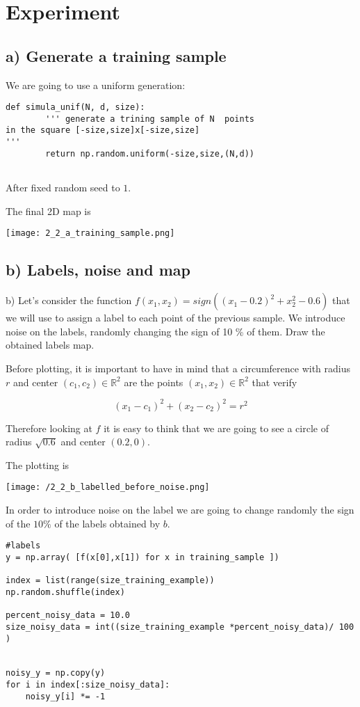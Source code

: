 \section{Experiment }

\subsection{a) Generate a training sample}

We are going to use a uniform generation:

\begin{verbatim}
def simula_unif(N, d, size):
        ''' generate a trining sample of N  points
in the square [-size,size]x[-size,size]
'''
        return np.random.uniform(-size,size,(N,d))
 
\end{verbatim}

After fixed random seed to $1$.

The final 2D map  is

\texttt{[image: 2\_2\_a\_training\_sample.png]}

\subsection{b) Labels, noise and map}

b) Let's consider the function $f(x_1, x_2) = sign((x_1 - 0.2)^2 + x_2^2 - 0.6)$ that we will use to assign a label to each point of the previous sample. We introduce noise on the labels, randomly changing the sign of 10 \% of them.
Draw the obtained labels map.


Before plotting, it is important to have in mind that a circumference with radius $r$ and center $(c_1, c_2) \in \mathbb R^2$ are the points $(x_1, x_2) \in \mathbb R^2$ that verify 

\[ (x_1 - c_1)^2 + (x_2 - c_2)^2 = r^2\]

Therefore looking at $f$ it is easy to think that we are going to see a circle of radius $\sqrt{0.6}$ and center $(0.2, 0)$.

The plotting is

\texttt{[image: /2\_2\_b\_labelled\_before\_noise.png]}

In order to introduce noise on the label we are going to change randomly the sign of the $10\%$ of  the labels obtained by $b$.



\begin{verbatim}
#labels 
y = np.array( [f(x[0],x[1]) for x in training_sample ])

index = list(range(size_training_example))
np.random.shuffle(index)

percent_noisy_data = 10.0
size_noisy_data = int((size_training_example *percent_noisy_data)/ 100 )


noisy_y = np.copy(y)
for i in index[:size_noisy_data]:
    noisy_y[i] *= -1

  \end{verbatim}

